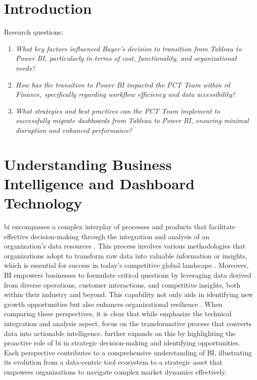 \chapter{Introduction}
Research questions:


    \begin{enumerate}[label=\textit{\arabic*.}]
        \item \textit{What key factors influenced Bayer's decision to transition 
        from Tableau to Power BI, particularly in terms of cost, functionality, 
        and organizational needs?}
        \item \textit{How has the transition to Power BI impacted the PCT 
        Team within \gls{rd} Finance, specifically regarding workflow 
        efficiency and data accessibility?}
        \item \textit{What strategies and best practices can the PCT Team 
        implement to successfully migrate dashboards from Tableau to Power BI, 
        ensuring minimal disruption and enhanced performance?}
    \end{enumerate}
    

\chapter{Understanding Business Intelligence and Dashboard Technology}

\gls{bi} encompasses a complex interplay of
processes and products that facilitate effective 
decision-making through the integration and analysis of an 
organization’s data resources \autocite[p.1]{taveraromeroBusinessIntelligenceBusiness2021}. 
This process involves various methodologies that organizations 
adopt to transform raw data into valuable information or 
insights, which is essential for success in today’s 
competitive global landscape \autocite[p.121]{jourdanBusinessIntelligenceAnalysis2008}. 
Moreover, BI empowers businesses to formulate critical 
questions by leveraging data derived from diverse operations, 
customer interactions, and competitive insights, both within 
their industry and beyond. This capability not only aids in 
identifying new growth opportunities but also enhances 
organizational resilience \autocite[p.308]{kumarBusinessIntelligence2024}. 
When comparing these perspectives, it is clear that while 
\citeauthor{taveraromeroBusinessIntelligenceBusiness2021} 
emphasize the technical integration 
and analysis aspect, \citeauthor{jourdanBusinessIntelligenceAnalysis2008} 
focus on the transformative process that converts data into actionable 
intelligence. \citeauthor{kumarBusinessIntelligence2024} 
further expands on this by highlighting 
the proactive role of \gls{bi} in strategic decision-making and 
identifying opportunities. Each perspective contributes to 
a comprehensive understanding of BI, illustrating its 
evolution from a data-centric tool ecosystem to a strategic asset 
that empowers organizations to navigate complex market 
dynamics effectively.

